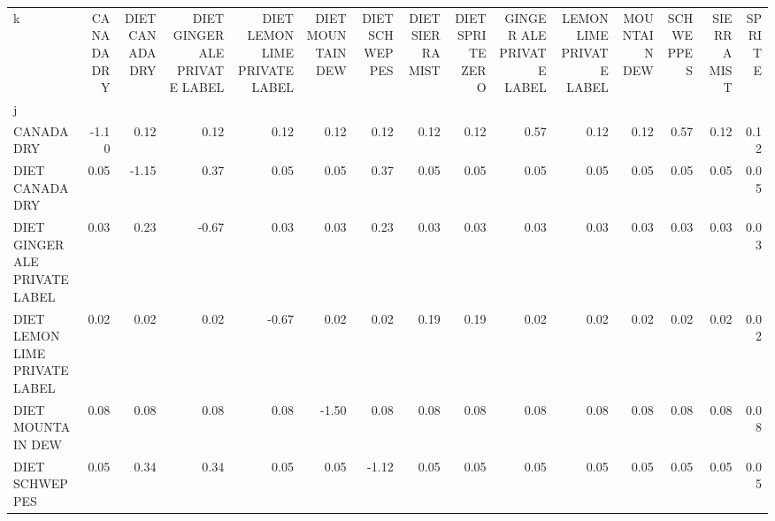 \begin{tabular}{lrrrrrrrrrrrrrr}
\toprule
k &  CANADA DRY &  DIET CANADA DRY &  DIET GINGER ALE PRIVATE LABEL &  DIET LEMON LIME PRIVATE LABEL &  DIET MOUNTAIN DEW &  DIET SCHWEPPES &  DIET SIERRA MIST &  DIET SPRITE ZERO &  GINGER ALE PRIVATE LABEL &  LEMON LIME PRIVATE LABEL &  MOUNTAIN DEW &  SCHWEPPES &  SIERRA MIST &  SPRITE \\
j                             &             &                  &                                &                                &                    &                 &                   &                   &                           &                           &               &            &              &         \\
\midrule
CANADA DRY                    &       -1.10 &             0.12 &                           0.12 &                           0.12 &               0.12 &            0.12 &              0.12 &              0.12 &                      0.57 &                      0.12 &          0.12 &       0.57 &         0.12 &    0.12 \\
DIET CANADA DRY               &        0.05 &            -1.15 &                           0.37 &                           0.05 &               0.05 &            0.37 &              0.05 &              0.05 &                      0.05 &                      0.05 &          0.05 &       0.05 &         0.05 &    0.05 \\
DIET GINGER ALE PRIVATE LABEL &        0.03 &             0.23 &                          -0.67 &                           0.03 &               0.03 &            0.23 &              0.03 &              0.03 &                      0.03 &                      0.03 &          0.03 &       0.03 &         0.03 &    0.03 \\
DIET LEMON LIME PRIVATE LABEL &        0.02 &             0.02 &                           0.02 &                          -0.67 &               0.02 &            0.02 &              0.19 &              0.19 &                      0.02 &                      0.02 &          0.02 &       0.02 &         0.02 &    0.02 \\
DIET MOUNTAIN DEW             &        0.08 &             0.08 &                           0.08 &                           0.08 &              -1.50 &            0.08 &              0.08 &              0.08 &                      0.08 &                      0.08 &          0.08 &       0.08 &         0.08 &    0.08 \\
DIET SCHWEPPES                &        0.05 &             0.34 &                           0.34 &                           0.05 &               0.05 &           -1.12 &              0.05 &              0.05 &                      0.05 &                      0.05 &          0.05 &       0.05 &         0.05 &    0.05 \\

\end{tabular}
